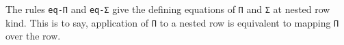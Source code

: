 \documentclass[authoryear, acmsmall, screen, review, nonacm]{acmart}
\begin{document}
\Ni The rules \verb!eq-Π! and \verb!eq-Σ! give the defining equations of \verb!Π! and \verb!Σ! at nested row kind. This is to say, application of \verb!Π! to a nested row is equivalent to mapping \verb!Π! over the row.
\begin{code} %
%
\>[4]%
\>[2424I]\AgdaSymbol{:}\AgdaSpace{}%
\AgdaSpace{}%
\AgdaSymbol{\{}\AgdaSpace{}%
\AgdaSymbol{:}\AgdaSpace{}%
\AgdaSpace{}%
\AgdaSpace{}%
\AgdaOperator{\AgdaInductiveConstructor{R[}}\AgdaSpace{}%
\AgdaOperator{\AgdaInductiveConstructor{R[}}\AgdaSpace{}%
\AgdaSpace{}%
\AgdaOperator{\AgdaInductiveConstructor{]}}\AgdaSpace{}%
\AgdaOperator{\AgdaInductiveConstructor{]}}\AgdaSymbol{\}}\AgdaSpace{}%
\AgdaSymbol{\{}\AgdaSpace{}%
\AgdaSymbol{:}\AgdaSpace{}%
\AgdaSpace{}%
\AgdaSymbol{(}\AgdaSpace{}%
\AgdaSymbol{)\}}\AgdaSpace{}%
\<%
\\
\>[.][@{}l@{}]\<[2424I]%
\>[9]\AgdaSpace{}%
\AgdaSymbol{\{}\AgdaSpace{}%
\AgdaSymbol{=}\AgdaSpace{}%
\AgdaSymbol{\}}\AgdaSpace{}%
\AgdaSpace{}%
\AgdaSpace{}%
\AgdaSpace{}%
\AgdaSpace{}%
\AgdaSymbol{\{}\AgdaSpace{}%
\AgdaSymbol{=}\AgdaSpace{}%
\AgdaSymbol{\}}\AgdaSpace{}%
\AgdaOperator{\AgdaInductiveConstructor{<\$>}}\AgdaSpace{}%
\<%
\\
%
\>[4]%
\>[2453I]\AgdaSymbol{:}\AgdaSpace{}%
\AgdaSpace{}%
\AgdaSymbol{\{}\AgdaSpace{}%
\AgdaSymbol{:}\AgdaSpace{}%
\AgdaSpace{}%
\AgdaSpace{}%
\AgdaOperator{\AgdaInductiveConstructor{R[}}\AgdaSpace{}%
\AgdaOperator{\AgdaInductiveConstructor{R[}}\AgdaSpace{}%
\AgdaSpace{}%
\AgdaOperator{\AgdaInductiveConstructor{]}}\AgdaSpace{}%
\AgdaOperator{\AgdaInductiveConstructor{]}}\AgdaSymbol{\}}\AgdaSpace{}%
\AgdaSymbol{\{}\AgdaSpace{}%
\AgdaSymbol{:}\AgdaSpace{}%
\AgdaSpace{}%
\AgdaSymbol{(}\AgdaSpace{}%
\AgdaSymbol{)\}}\AgdaSpace{}%
\<%
\\
\>[.][@{}l@{}]\<[2453I]%
\>[9]\AgdaSpace{}%
\AgdaSymbol{\{}\AgdaSpace{}%
\AgdaSymbol{=}\AgdaSpace{}%
\AgdaSymbol{\}}\AgdaSpace{}%
\AgdaSpace{}%
\AgdaSpace{}%
\AgdaSpace{}%
\AgdaSpace{}%
\AgdaSymbol{\{}\AgdaSpace{}%
\AgdaSymbol{=}\AgdaSpace{}%
\AgdaSymbol{\}}\AgdaSpace{}%
\AgdaOperator{\AgdaInductiveConstructor{<\$>}}\AgdaSpace{}%
\<%
\end{code}
\end{document}
